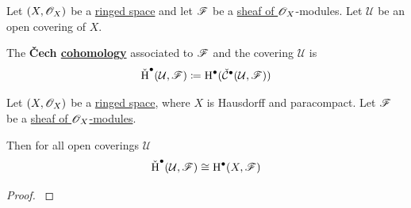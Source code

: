 \documentclass[../../main]{subfiles}
\begin{document}
\begin{definition}\label{def:cech-cohomology}
  Let \((X, \mathscr{O}_{X})\) be a \hyperref[def:ringed-space]{ringed space} and let \(\mathscr{F}\) be a \hyperref[def:sheaf-of-modules]{sheaf of \(\mathscr{O}_{X}\)}-modules.
  Let \(\mathcal{U}\) be an open covering of \(X\).

  The \textbf{\v{C}ech \hyperref[def:cohomology]{cohomology}} associated to \(\mathscr{F}\) and the covering \(\mathcal{U}\) is
  \begin{equation*}
    \check{\operatorname{H}}^{\bullet}(\mathcal{U}, \mathscr{F}) \coloneq \operatorname{H}^{\bullet}(\check{\mathcal{C}}^{\bullet}(\mathcal{U}, \mathscr{F}))
  \end{equation*}
\end{definition}

\begin{theorem}
  Let \((X, \mathscr{O}_{X})\) be a \hyperref[def:ringed-space]{ringed space}, where \(X\) is Hausdorff and paracompact.
  Let \(\mathscr{F}\) be a \hyperref[def:sheaf-of-modules]{sheaf of \(\mathscr{O}_{X}\)-modules}.

  Then for all open coverings \(\mathcal{U}\)
  \begin{equation*}
    \check{\operatorname{H}}^{\bullet}(\mathcal{U}, \mathscr{F}) \cong \operatorname{H}^{\bullet}(X, \mathscr{F})
  \end{equation*}
\end{theorem}
\begin{proof}
  \cite[Theorem 5.10.1]{godementTopologieAlgebriqueTheorie1998}
\end{proof}
\end{document}
